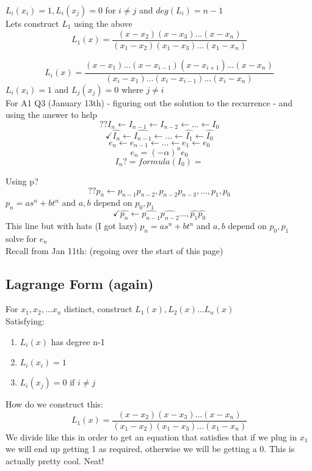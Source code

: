\documentclass[12pt]{article}
\begin{document}
	$L_i(x_i) = 1, L_i(x_j) = 0$ for $i \ne j$ and $deg(L_i) = n-1$\\
	Lets construct $L_1$ using the above\\
	$$L_1(x) = \frac{(x-x_2)(x-x_3)...(x-x_n)}{(x_1-x_2)(x_1-x_3)...(x_1-x_n)}$$
	
	$$L_i(x) = \frac{(x-x_1)...(x-x_{i-1})(x-x_{i+1})...(x-x_n)}{(x_i-x_1)...(x_i-x_{i-1})...(x_i-x_n)}$$
	$L_i(x_i) = 1$ and $L_j(x_j) = 0$ where $j \ne i$\\
	
	For A1 Q3 (January 13th) - figuring out the solution to the recurrence - and using the answer to help\\
	$$?? \boxed{I_n} \leftarrow I_{n-1} \leftarrow I_{n-2} \leftarrow ... \leftarrow I_0$$
	$$\checkmark \boxed{\hat{I_n}} \leftarrow \hat{I_{n-1}} \leftarrow ... \leftarrow \hat{I_1} \leftarrow \hat{I_0}$$
	$$e_n \leftarrow e_{n-1} \leftarrow ... \leftarrow e_1 \leftarrow e_0$$
	$$e_n = (-\alpha)^ne_0$$
	$$I_n ?= formula(I_0) = $$
	
	Using p?\\
	$$?? \boxed{p_n} \leftarrow p_{n-1} p_{n-2}, p_{n-2}p_{n-3}, ..., p_1, p_0$$
	$p_n = as^n + bt^n$ and $a,b$ depend on $p_0, p_1$\\
	$$\checkmark \boxed{\hat{p_n}} \leftarrow \hat{p_{n-1}} \hat{p_{n-2}} ..., \hat{p_1}\hat{p_0}$$
	This line but with hats (I got lazy)  $p_n = as^n + bt^n$ and $a,b$ depend on $p_0, p_1$\\
	solve for $e_n$\\
	
	Recall from Jan 11th: (regoing over the start of this page)\\
	
	\subsection*{Lagrange Form (again)}
	For $x_1, x_2, ... x_n$ distinct, construct $L_1(x), L_2(x)...L_n(x)$\\
	Satisfying:\\
	\begin{enumerate}
		\item $L_i(x)$ has degree n-1
		\item $L_i(x_i) = 1$
		\item $L_i(x_j) = 0$ if $i \ne j$
	\end{enumerate}

	How do we construct this:\\
	$$L_1(x) = \frac{(x-x_2)(x-x_3)...(x-x_n)}{(x_1-x_2)(x_1-x_3)...(x_1-x_n)}$$
	We divide like this in order to get an equation that satisfies that if we plug in $x_1$ we will end up getting 1 as required, otherwise we will be getting a 0. This is actually pretty cool. Neat!\\
	
\end{document}
